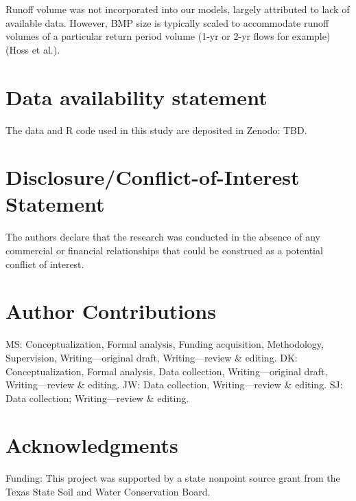 \documentclass[utf8]{FrontiersinHarvard}
\begin{document}
Runoff volume was not incorporated into our models, largely attributed to lack of available data. However, BMP size is typically scaled to accommodate runoff volumes of a particular return period volume (1-yr or 2-yr flows for example) (Hoss et al.).

\hypertarget{data-availability-statement}{%
\section*{Data availability statement}\label{data-availability-statement}}

The data and R code used in this study are deposited in Zenodo: TBD.

\hypertarget{disclosureconflict-of-interest-statement}{%
\section*{Disclosure/Conflict-of-Interest Statement}\label{disclosureconflict-of-interest-statement}}

The authors declare that the research was conducted in the absence of any
commercial or financial relationships that could be construed as a potential
conflict of interest.

\hypertarget{author-contributions}{%
\section*{Author Contributions}\label{author-contributions}}

MS: Conceptualization, Formal analysis, Funding acquisition, Methodology, Supervision, Writing---original draft, Writing---review \& editing.
DK: Conceptualization, Formal analysis, Data collection, Writing---original draft, Writing---review \& editing.
JW: Data collection, Writing---review \& editing.
SJ: Data collection; Writing---review \& editing.

\hypertarget{acknowledgments}{%
\section*{Acknowledgments}\label{acknowledgments}}

Funding: This project was supported by a state nonpoint source grant from the Texas State Soil and Water Conservation Board.
\end{document}
